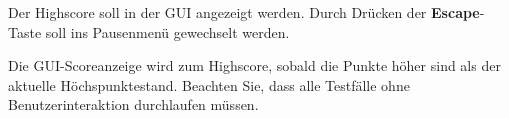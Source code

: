 Der Highscore soll in der GUI angezeigt werden. Durch Drücken der \textbf{Escape}-Taste soll ins Pausenmenü gewechselt werden.

Die GUI-Scoreanzeige wird zum Highscore, sobald die Punkte höher sind als der aktuelle H\"ochspunktestand. 
Beachten Sie, dass alle Testf\"alle ohne Benutzerinteraktion durchlaufen m\"ussen.
